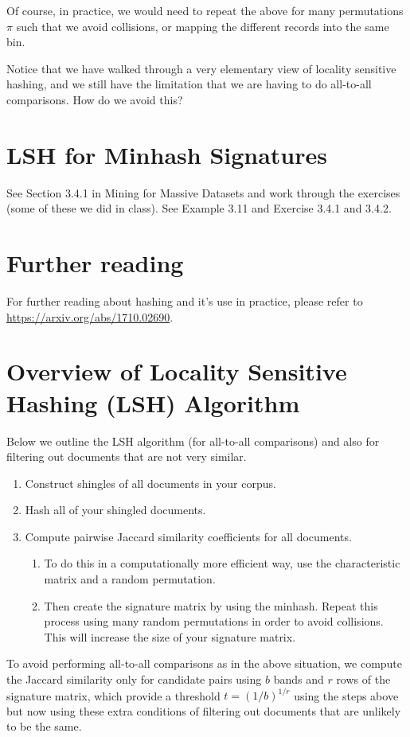 \documentclass[11pt]{article}
\begin{document}
Of course, in practice, we would need to repeat the above for many permutations $\pi$ such that we avoid collisions, or mapping the different records into the same bin. 

Notice that we have walked through a very elementary view of locality sensitive hashing, and we still have the limitation that we are having to do all-to-all comparisons. How do we avoid this?

\section{LSH for Minhash Signatures} 
See Section 3.4.1 in Mining for Massive Datasets and work through the exercises (some of these we did in class). 
See Example 3.11 and Exercise 3.4.1 and 3.4.2. 

\section{Further reading}
For further reading about hashing and it's use in practice, please refer to \url{https://arxiv.org/abs/1710.02690}. 

\section{Overview of Locality Sensitive Hashing (LSH) Algorithm}
Below we outline the LSH algorithm (for all-to-all comparisons) and also for filtering out documents that are not very similar. 

\begin{enumerate}
\item Construct shingles of all documents in your corpus.
\item Hash all of your shingled documents. 
\item Compute pairwise Jaccard similarity coefficients for all documents.
\begin{enumerate}
\item To do this in a computationally more efficient way, use the characteristic matrix and a random permutation. 
\item Then create the signature matrix by using the minhash. Repeat this process using many random permutations in order to avoid collisions. This will increase the size of your signature matrix. 
\end{enumerate}
\end{enumerate}
To avoid performing all-to-all comparisons as in the above situation, we compute the Jaccard similarity only for candidate pairs using $b$ bands and $r$ rows of the signature matrix, which provide a threshold $t= (1/b)^{1/r}$ using the steps above but now using these extra conditions of filtering out documents that are unlikely to be the same. 





\small{


}
\end{document}

